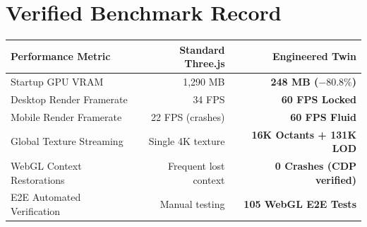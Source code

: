 \documentclass[10pt,letterpaper]{article}
\begin{document}
\begin{minipage}[t]{0.51\textwidth}
    \section*{Verified Benchmark Record}
    \footnotesize
    \begin{tabularx}{\linewidth}{X r r}
        \toprule
        \textbf{Performance Metric} & \textbf{Standard Three.js} & \textbf{Engineered Twin} \\
        \midrule
        Startup GPU VRAM & 1,290 MB & \textbf{248 MB ($-80.8\%$)} \\
        Desktop Render Framerate & 34 FPS & \textbf{60 FPS Locked} \\
        Mobile Render Framerate & 22 FPS (crashes) & \textbf{60 FPS Fluid} \\
        Global Texture Streaming & Single 4K texture & \textbf{16K Octants + 131K LOD} \\
        WebGL Context Restorations & Frequent lost context & \textbf{0 Crashes (CDP verified)} \\
        E2E Automated Verification & Manual testing & \textbf{105 WebGL E2E Tests} \\
        \bottomrule
    \end{tabularx}
\end{minipage}
\hfill
\end{document}
